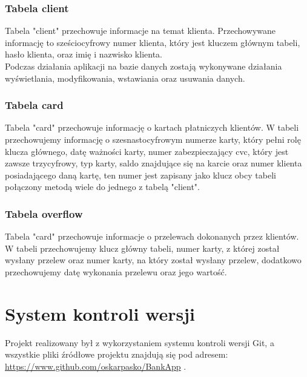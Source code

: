 \documentclass[12pt, letterpaper]{article}
\begin{document}
\subsubsection{Tabela client}

\quad Tabela "client" przechowuje informacje na temat klienta. Przechowywane informację to sześciocyfrowy numer klienta, który jest kluczem głównym tabeli, hasło klienta, oraz imię i nazwisko klienta.\\

\quad Podczas działania aplikacji na bazie danych zostają wykonywane działania wyświetlania, modyfikowania, wstawiania oraz usuwania danych.

\subsubsection{Tabela card}

\quad Tabela "card" przechowuje informację o kartach płatniczych klientów. W tabeli przechowujemy informację o szesnastocyfrowym numerze karty, który pełni rolę klucza głównego, datę ważności karty, numer zabezpieczający cvc, który jest zawsze trzycyfrowy, typ karty, saldo znajdujące się na karcie oraz numer klienta posiadającego daną kartę, ten numer jest zapisany jako klucz obcy tabeli połączony metodą wiele do jednego z tabelą "client".



\subsubsection{Tabela overflow}

\quad Tabela "card"  przechowuje informacje o przelewach dokonanych przez klientów. W tabeli przechowujemy klucz główny tabeli, numer karty, z której został wysłany przelew oraz numer karty, 
na który został wysłany przelew, dodatkowo przechowujemy datę wykonania przelewu oraz jego wartość.


\section{System kontroli wersji}

\quad Projekt realizowany był z wykorzystaniem systemu kontroli wersji Git, a wszystkie pliki źródłowe projektu znajdują się pod adresem:\\  \url{https://www.github.com/oskarpasko/BankApp} . 
\end{document}
